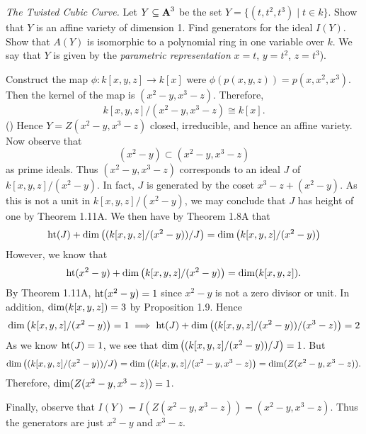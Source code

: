 \documentclass[10pt]{amsart}
\begin{document}
\begin{exercise}[1.2]
    \emph{The Twisted Cubic Curve.}
    Let $Y \subseteq \aa^3$ be the set $Y = \{(t,t^2,t^3) \mid t \in k\}$.
    Show that $Y$ is an affine variety of dimension 1. Find generators 
    for the ideal $I(Y)$. Show that $A(Y)$ is isomorphic to a polynomial ring 
    in one variable over $k$. We say that $Y$ is given by the \emph{parametric representation} 
    $x = t$, $y = t^2$, $z = t^3$). 
\end{exercise}

\begin{solution}
    \begin{luke}
        Construct the map $\phi: k[x,y,z] \to k[x]$ were 
    $\phi(p(x, y, z)) = p(x, x^2, x^3)$. Then the kernel of the 
    map is $(x^2 - y, x^3 - z)$. Therefore, 
    \[
        k[x,y,z]/(x^2 - y, x^3 - z) \cong k[x]. 
    \]
    ()
    Hence $Y = Z(x^2 -y, x^3 - z)$ closed, irreducible, and hence an affine 
    variety. 
    Now observe that 
    \[
        (x^2 - y) \subset (x^2 - y, x^3 - z)
    \]
    as prime ideals. Thus $(x^2 - y, x^3 - z)$ corresponds to 
    an ideal $J$ of $k[x,y,z]/(x^2 - y)$. In fact, $J$ is generated by 
    the coset $x^3 - z + (x^2 - y)$. As this is not a unit in $k[x,y,z]/(x^2 - y)$, 
    we may conclude that $J$ has height of one by Theorem 1.11A. We then have by 
    Theorem 1.8A that 
    \[
        \Ht(J) + \Dim\left( (k[x,y,z]/(x^2 - y))/J \right) = \Dim\left( k[x,y,z]/(x^2 - y) \right)
    \]
    However, we know that 
    \[
        \Ht(x^2 - y) + \Dim\left( k[x,y,z]/(x^2 - y) \right) = \Dim( k[x,y,z]).
    \]
    By Theorem 1.11A, $\Ht(x^2 - y) = 1$ since $x^2 - y$ is not a zero divisor or unit.
    In addition, $\Dim(k[x,y,z]) = 3$ by Proposition 1.9. Hence 
    \[
        \Dim\left( k[x,y,z]/(x^2 - y) \right) = 1 \implies 
        \Ht(J) + \Dim\left( (k[x,y,z]/(x^2 - y))/(x^3 - z) \right)
        = 2
    \]
    As we know $\Ht(J) = 1$, we see that 
    $\Dim\left( (k[x,y,z]/(x^2 - y))/J \right) = 1$. 
    But 
    \[
        \Dim\left( (k[x,y,z]/(x^2 - y))/J \right) = 
        \Dim\left( (k[x,y,z]/(x^2 - y, x^3 - z) \right) 
        = \Dim(Z(x^2 - y, x^3 - z)).
    \]
    Therefore, $\Dim(Z(x^2 - y, x^3 - z)) = 1$. 

    Finally, observe that $I(Y) = I(Z(x^2-y, x^3 - z)) = (x^2 - y, x^3 - z)$. 
    Thus the generators are just $x^2 - y$ and $x^3 - z$. 
    \end{luke}

\end{solution}
\end{document}
